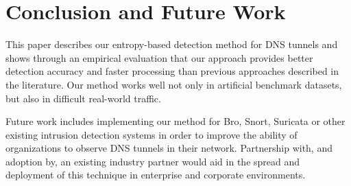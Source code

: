 \documentclass{llncs}
\begin{document}


\section{Conclusion and Future Work}
\label{conclusion}

This paper describes our entropy-based detection method for DNS
tunnels and shows through an empirical evaluation that our approach
provides better detection accuracy and faster processing than previous
approaches described in the literature. Our method works well not only
in artificial benchmark datasets, but also in difficult real-world
traffic. 


Future work includes implementing our method for Bro, Snort, Suricata
or other existing intrusion detection systems in order to improve the
ability of organizations to observe DNS tunnels in their
network. Partnership with, and adoption by, an existing industry
partner would aid in the spread and deployment of this technique in
enterprise and corporate environments.


\end{document}
